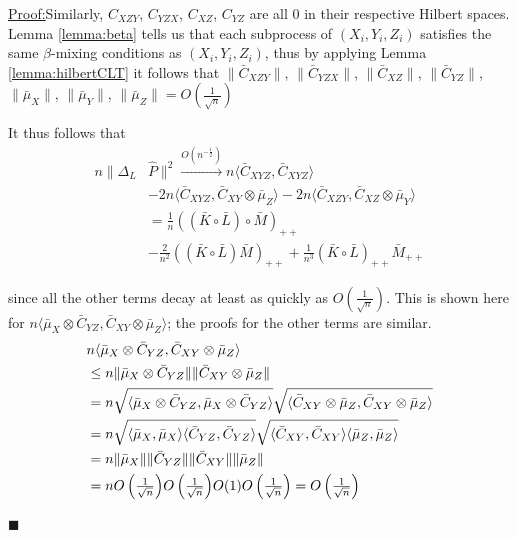 \documentclass[]{article}
\newenvironment{claimproof}[1]{\par\noindent\underline{Proof:}\space#1}{\hfill $\blacksquare$}
\begin{document}
\begin{claimproof}
Similarly, $C_{XZY}$, $C_{YZX}$, $C_{XZ}$, $C_{YZ}$ are all 0 in their respective Hilbert spaces. Lemma \ref{lemma:beta} tells us that each subprocess of $(X_i,Y_i,Z_i)$ satisfies the same $\beta$-mixing conditions as $(X_i,Y_i,Z_i)$, thus by applying Lemma \ref{lemma:hilbertCLT} it follows that $\|\bar{C}_{XZY}\|$, $\|\bar{C}_{YZX}\|$, $\|\bar{C}_{XZ}\|$, $\|\bar{C}_{YZ}\|$, $\|\bar{\mu}_X\|$, $\|\bar{\mu}_Y\|$, $\|\bar{\mu}_Z\| = O\left(\frac{1}{\sqrt{n}}\right)$

It thus follows that
\begin{align*}
n\|\Delta_L& \hat{P}\|^2  \xrightarrow{O(n^{-\frac{1}{2}})} n\langle \bar{C}_{XYZ},\bar{C}_{XYZ} \rangle \\ &-
2n\langle \bar{C}_{XYZ},\bar{C}_{XY}\otimes\bar{\mu}_Z \rangle -
2n\langle \bar{C}_{XZY},\bar{C}_{XZ}\otimes\bar{\mu}_Y \rangle \\ &=
\frac{1}{n}((\bar{K}\circ \bar{L}) \circ \bar{M})_{++}\\& - \frac{2}{n^2}((\bar{K}\circ \bar{L})\bar{M})_{++} + \frac{1}{n^3}(\bar{K}\circ \bar{L})_{++}\bar{M}_{++}
\end{align*}

since all the other terms decay at least as quickly as $O(\frac{1}{\sqrt{n}})$. This is shown here for $n\langle \bar{\mu}_X\otimes\bar{C}_{YZ},\bar{C}_{XY}\otimes\bar{\mu}_Z \rangle$; the proofs for the other terms are similar.
\begin{align*}
&n\langle \bar{\mu}_X\otimes\bar{C}_{YZ},\bar{C}_{XY}\otimes\bar{\mu}_Z \rangle \\
&\leq n \| \bar{\mu}_X\otimes\bar{C}_{YZ}\| \|\bar{C}_{XY}\otimes\bar{\mu}_Z \| \\
& = n\sqrt{\langle \bar{\mu}_X\otimes\bar{C}_{YZ} , \bar{\mu}_X\otimes\bar{C}_{YZ} \rangle} \sqrt{\langle \bar{C}_{XY}\otimes\bar{\mu}_Z, \bar{C}_{XY}\otimes\bar{\mu}_Z \rangle} \\
& = n\sqrt{\langle \bar{\mu}_X, \bar{\mu}_X \rangle \langle \bar{C}_{YZ} , \bar{C}_{YZ} \rangle} \sqrt{\langle \bar{C}_{XY}, \bar{C}_{XY} \rangle \langle \bar{\mu}_Z, \bar{\mu}_Z \rangle} \\
& =  n \| \bar{\mu}_X\|\|\bar{C}_{YZ}\| \|\bar{C}_{XY}\|\|\bar{\mu}_Z \| \\
& = n \mathsmaller{O\left(\frac{1}{\sqrt{n}}\right)} \mathsmaller{O\left(\frac{1}{\sqrt{n}}\right)} O(1) \mathsmaller{O\left(\frac{1}{\sqrt{n}}\right)} = \mathsmaller{O\left(\frac{1}{\sqrt{n}}\right)}
\end{align*}


\end{claimproof}
\end{document}
